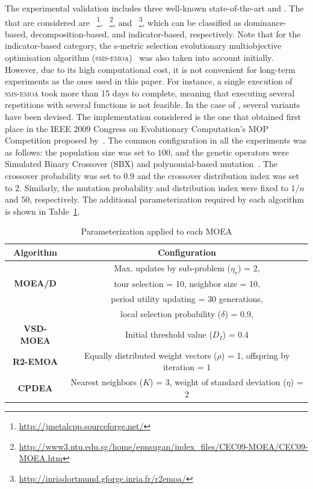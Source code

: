 The experimental validation includes three well-known state-of-the-art \MOEAS{} and \VSDMOEA{}.
%
The \MOEAS{} that are considered are \NSGAII{}~\footnote{\url{http://jmetalcpp.sourceforge.net/}}, \MOEAD{}~\footnote{\url{http://www3.ntu.edu.sg/home/epnsugan/index_files/CEC09-MOEA/CEC09-MOEA.htm}}, and \RMOEA{}~\footnote{\url{http://inriadortmund.gforge.inria.fr/r2emoa/}}, 
which can be classified as dominance-based, decomposition-based, and indicator-based, respectively.
%
Note that for the indicator-based category, the s-metric selection evolutionary multiobjective optimisation algorithm 
(\textsc{sms-emoa})~\citep{Joel:SMSEMOA} was also taken into account initially.
%
However, due to its high computational cost, it is not convenient for long-term experiments as the ones used in this paper.
%
For instance, a single execution of \textsc{sms-emoa} took more than 15 days to complete, meaning that executing several
repetitions with several functions is not feasible.
%
In the case of \MOEAD{}, several variants have been devised.
%
The \MOEAD{} implementation considered is the one that obtained first place in the IEEE 2009 Congress on Evolutionary Computation's 
MOP Competition proposed by~\cite{zhang2009performance}.
%
The common configuration in all the experiments was as follows: the population size was set to $100$, and the genetic 
operators were Simulated Binary Crossover (SBX) and polynomial-based 
mutation~\citep{Joel:SBX1994, Joel:Mutation}.
%
The crossover probability was set to $0.9$ and the crossover distribution index was set to $2$.
%
Similarly, the mutation probability and distribution index were fixed to $1/n$ and $50$, respectively.
%
The additional parameterization required by each algorithm is shown in Table~\ref{tab:Parametrization}.




\begin{table}[t]
\centering
\caption{ Parameterization applied to each MOEA}
\label{tab:Parametrization}
\begin{tabular}{c|c}
\hline
\textbf{Algorithm} & \textbf{Configuration} \\ \hline
\multirow{3}{*}{\textbf{MOEA/D}} &Max. updates by sub-problem ($\eta_r$) = 2, \\
 & tour selection = 10,   neighbor size = 10, \\
 & period utility updating = 30 generations, \\ 
 & local selection probability ($\delta$) = 0.9,\\ \hline
	\textbf{VSD-MOEA} & Initial threshold value ($D_I$) = 0.4 \\ \hline
	\textbf{R2-EMOA} & Equally distributed weight vectors ($\rho$) = 1, offspring by iteration = $1$ \\ \hline
	\textbf{CPDEA} & Nearest neighbors ($K$) = 3, weight of standard deviation ($\eta$) = 2 \\ \hline
\end{tabular}
\end{table}

